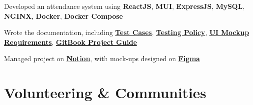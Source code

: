 \documentclass[]{deedy-resume-openfont}
\begin{document}
\begin{minipage}[t]{0.65\textwidth}
\begin{tightemize}
    \item Developed an attendance system using \textbf{ReactJS}, \textbf{MUI}, \textbf{ExpressJS}, \textbf{MySQL}, \textbf{NGINX}, \textbf{Docker}, \textbf{Docker Compose}
    \item Wrote the documentation, including \textbf{\href{https://docs.google.com/spreadsheets/d/1IoFYTfmonSmj8XrJVA4r6KDa8BZbtHO_/edit?usp=sharing&ouid=106105819354897704806&rtpof=true&sd=true}{Test Cases}}, \textbf{\href{https://github.com/Rubix982/Reflex/blob/main/docs/pdfs/Testing\%20Policy.pdf}{Testing Policy}}, \textbf{\href{https://github.com/Rubix982/Reflex/blob/main/docs/pdfs/UI\%20Mockups.pdf}{UI Mockup Requirements}}, \textbf{\href{https://k180307.gitbook.io/reflex/}{GitBook Project Guide}}
    \item Managed project on \textbf{\href{https://www.notion.so/Reflex-bfe33ff4e9984072aeac514fe6d6bb30}{Notion}}, with mock-ups designed on \textbf{\href{https://www.figma.com/file/PKzIocgkOTkDdy2mtKyk9c/Reflex?node-id=0\%3A1}{Figma}}
\end{tightemize} 


\section{Volunteering \& Communities}
\textbullet{} 

\textbullet{} 

\textbullet{} 

\textbullet{} 
\sectionsep

\end{minipage} 
\end{document}
